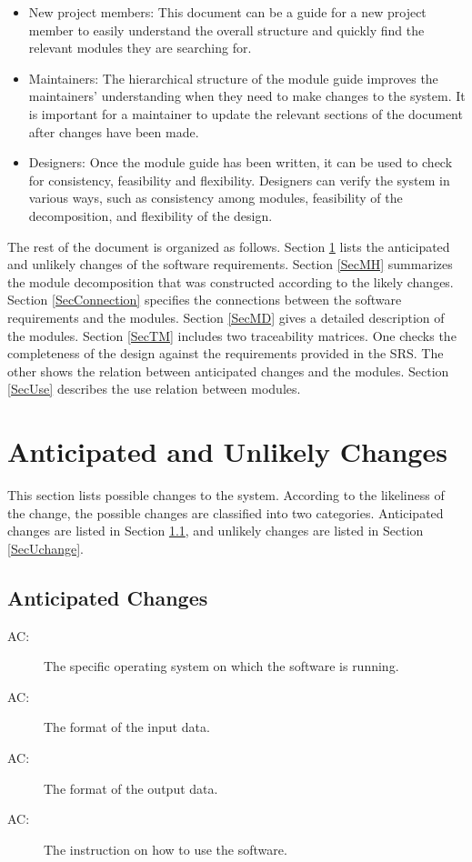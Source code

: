\documentclass[12pt, titlepage]{article}
\newcounter{acnum}
\newcommand{\actheacnum}{AC\theacnum}
\begin{document}
\begin{itemize}
\item New project members: This document can be a guide for a new project member
  to easily understand the overall structure and quickly find the
  relevant modules they are searching for.
\item Maintainers: The hierarchical structure of the module guide improves the
  maintainers' understanding when they need to make changes to the system. It is
  important for a maintainer to update the relevant sections of the document
  after changes have been made.
\item Designers: Once the module guide has been written, it can be used to
  check for consistency, feasibility and flexibility. Designers can verify the
  system in various ways, such as consistency among modules, feasibility of the
  decomposition, and flexibility of the design.
\end{itemize}

The rest of the document is organized as follows. Section
\ref{SecChange} lists the anticipated and unlikely changes of the software
requirements. Section \ref{SecMH} summarizes the module decomposition that
was constructed according to the likely changes. Section \ref{SecConnection}
specifies the connections between the software requirements and the
modules. Section \ref{SecMD} gives a detailed description of the
modules. Section \ref{SecTM} includes two traceability matrices. One checks
the completeness of the design against the requirements provided in the SRS. The
other shows the relation between anticipated changes and the modules. Section
\ref{SecUse} describes the use relation between modules.

\section{Anticipated and Unlikely Changes} \label{SecChange}

This section lists possible changes to the system. According to the likeliness
of the change, the possible changes are classified into two
categories. Anticipated changes are listed in Section \ref{SecAchange}, and
unlikely changes are listed in Section \ref{SecUchange}.

\subsection{Anticipated Changes} \label{SecAchange}

\begin{description}
\item[ \actheacnum :] The specific operating system on which the software is running.
\item[ \actheacnum :] The format of the input data.
\item[ \actheacnum :] The format of the output data.
\item[ \actheacnum :] The instruction on how to use the software.
\end{description}
\end{document}
